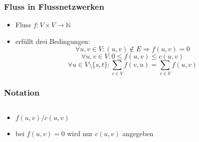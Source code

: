 \documentclass{beamer}
\begin{document}
\begin{frame}
\frametitle{Fluss in Flussnetzwerken}
\begin{itemize}
\item Fluss $f: V \times V \to \mathbb{N}$
\item erfüllt drei Bedingungen:
\begin{equation}
\forall u,v\in V\colon (u,v)\notin E\Rightarrow f(u,v) = 0
\end{equation}
\begin{equation}
\forall u,v\in V\colon 0\leq f(u,v)\leq c(u,v)
\end{equation}
\begin{equation}
\forall u\in V\setminus\{s,t\}\colon\sum_{v\in V} f(v,u) = \sum_{v\in V} f(u,v)
\end{equation}
\end{itemize}
\end{frame}

\begin{frame}
\frametitle{Notation}
\begin{columns}
\begin{column}{.4\textwidth}
\begin{itemize}
\item $f(u,v)/c(u,v)$
\item bei $f(u,v) = 0$ wird nur $c(u,v)$ angegeben
\end{itemize}
\end{column}
\begin{column}{.55\textwidth}
\begin{adjustbox}{width=\textwidth}
\end{adjustbox}
\end{column}
\end{columns}
\end{frame}
\end{document}
